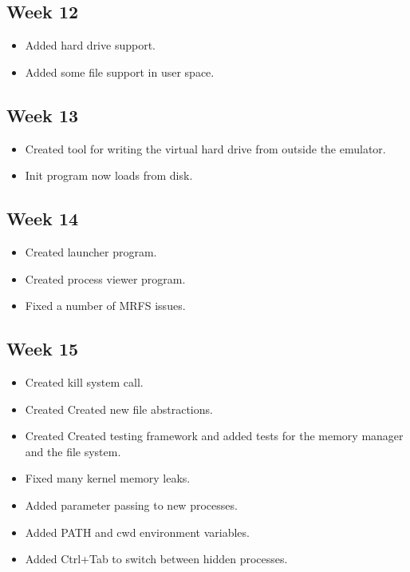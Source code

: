 \documentclass[a4paper]{report}
\begin{document}
\subsection*{Week 12}
\begin{itemize}
\item Added hard drive support.
\item Added some file support in user space.

\end{itemize}

\subsection*{Week 13}
\begin{itemize}
\item Created tool for writing the virtual hard drive from outside the emulator.
\item Init program now loads from disk.
\end{itemize}

\subsection*{Week 14}
\begin{itemize}
\item Created launcher program.
\item Created process viewer program.
\item Fixed a number of MRFS issues.
\end{itemize}

\subsection*{Week 15}
\begin{itemize}
\item Created kill system call.
\item Created Created new file abstractions.
\item Created Created testing framework and added tests for the memory manager and the file system.
\item Fixed many kernel memory leaks.
\item Added parameter passing to new processes.
\item Added PATH and cwd environment variables.
\item Added Ctrl+Tab to switch between hidden processes.
\end{itemize}
\end{document}
